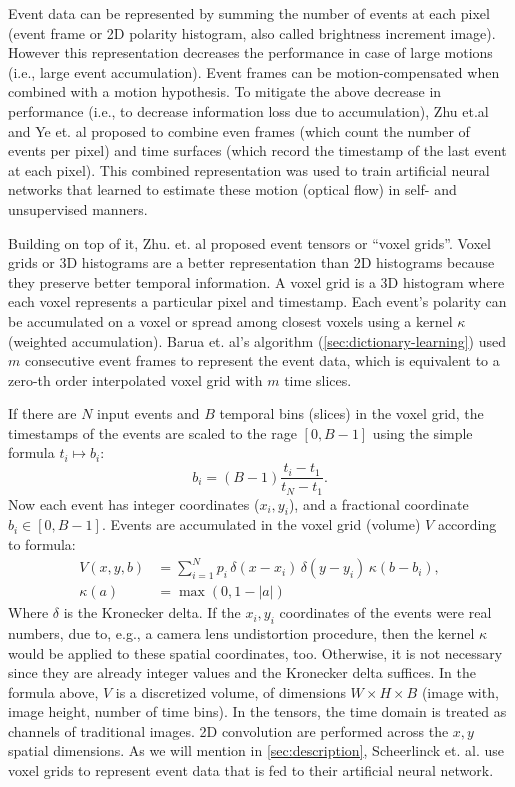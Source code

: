 \documentclass[10pt]{report}
\begin{document}
Event data can be represented by summing the number of events at each pixel (event frame or 2D polarity histogram, also called brightness increment image).
However this representation decreases the performance in case of large motions (i.e., large event accumulation). 
Event frames can be motion-compensated \cite{Gallego17ral} when combined with a motion hypothesis.
To mitigate the above decrease in performance (i.e., to decrease information loss due to accumulation), Zhu et.al \cite{Zhu18rss} and Ye et. al \cite{Ye19arxiv} proposed to combine even frames (which count the number of events per pixel) and time surfaces (which record the timestamp of the last event at each pixel). 
This combined representation was used to train artificial neural networks that learned to estimate these motion (optical flow) in self- and unsupervised manners.

Building on top of it, Zhu. et. al \cite{Zhu19cvpr} proposed event tensors or ``voxel grids''.
Voxel grids or 3D histograms are a better representation than 2D histograms because they preserve better temporal information. 
A voxel grid is a 3D histogram where each voxel represents a particular pixel and timestamp. 
Each event's polarity can be accumulated on a voxel or spread among closest voxels using a kernel $\kappa$ (weighted accumulation). 
Barua et. al's algorithm (\autoref{sec:dictionary-learning}) used $m$ consecutive event frames to represent the event data, which is equivalent to a zero-th order interpolated voxel grid with $m$ time slices. 

If there are $N$ input events and $B$ temporal bins (slices) in the voxel grid, the timestamps of the events are scaled to the rage $[0, B - 1]$ using the simple formula $t_i \mapsto b_i$:
\begin{equation}
b_{i} = (B - 1)\frac{t_{i} - t_{1}}{t_{N} - t_{1}}.
\end{equation}
Now each event has integer coordinates ($x_i, y_i$), and a fractional coordinate $b_{i} \in [0, B - 1]$. 
Events are accumulated in the voxel grid (volume) $V$ according to formula:
\begin{align}
V(x, y, b) & = \sum_{i=1}^{N} p_{i} \, \delta(x - x_{i})\, \delta(y - y_{i}) \, \kappa(b - b_{i}), \label{eq:voxel-voting}\\
\kappa(a) & = \max(0, 1 - |a|) \label{eq:voxel-voting:linear-kernel}
\end{align}
Where $\delta$ is the Kronecker delta. 
If the $x_i,y_i$ coordinates of the events were real numbers, due to, e.g., a camera lens undistortion procedure, then the kernel $\kappa$ would be applied to these spatial coordinates, too. 
Otherwise, it is not necessary since they are already integer values and the Kronecker delta suffices.
In the formula above, $V$ is a discretized volume, of dimensions $W \times H \times B$ (image with, image height, number of time bins).
In the tensors, the time domain is treated as channels of traditional images. 2D convolution are performed across the $x, y$ spatial dimensions. 
As we will mention in \autoref{sec:description}, Scheerlinck et. al. \cite{Scheerlinck20wacv} use voxel grids to represent event data that is fed to their artificial neural network.
\end{document}
